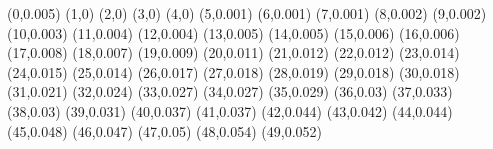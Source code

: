 (0,0.005)
(1,0)
(2,0)
(3,0)
(4,0)
(5,0.001)
(6,0.001)
(7,0.001)
(8,0.002)
(9,0.002)
(10,0.003)
(11,0.004)
(12,0.004)
(13,0.005)
(14,0.005)
(15,0.006)
(16,0.006)
(17,0.008)
(18,0.007)
(19,0.009)
(20,0.011)
(21,0.012)
(22,0.012)
(23,0.014)
(24,0.015)
(25,0.014)
(26,0.017)
(27,0.018)
(28,0.019)
(29,0.018)
(30,0.018)
(31,0.021)
(32,0.024)
(33,0.027)
(34,0.027)
(35,0.029)
(36,0.03)
(37,0.033)
(38,0.03)
(39,0.031)
(40,0.037)
(41,0.037)
(42,0.044)
(43,0.042)
(44,0.044)
(45,0.048)
(46,0.047)
(47,0.05)
(48,0.054)
(49,0.052)
